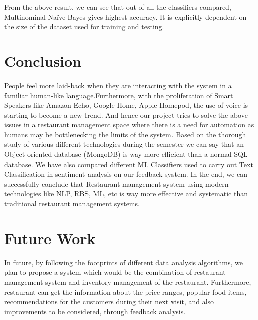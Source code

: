 \documentclass[conference]{IEEEtran}
\begin{document}
{From the above result, we can see that out of all the classifiers compared, Multinominal Naïve Bayes gives highest accuracy. It is explicitly dependent on the size of the dataset used for training and testing. 

\section{Conclusion}
 People feel more laid-back when they are interacting with the system in a familiar human-like language.Furthermore, with the proliferation of Smart Speakers like Amazon Echo, Google Home, Apple Homepod, the use of voice is starting to become a new trend. And hence our project tries to solve the above issues in a restaurant management space where there is a need for automation as humans may be bottlenecking the limits of the system. Based on the thorough study of various different technologies during the semester we can say that an Object-oriented database (MongoDB) is way more efficient than a normal SQL database. We have also compared different ML Classifiers used to carry out Text Classification in sentiment analysis on our feedback system. In the end, we can successfully conclude that Restaurant management system using modern technologies like NLP, RBS, ML, etc is way more effective and systematic than traditional restaurant management systems. 

\section{Future Work}

	In future, by following the footprints of different data analysis algorithms, we plan to propose a system which would be the combination of restaurant management  system and inventory management of the restaurant. 
	Furthermore, restaurant can get the information about the price ranges, popular food items, recommendations for the customers during their next visit, and also improvements to be considered, through feedback analysis.
	

}
\end{document}

